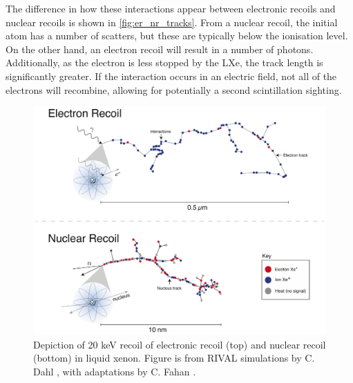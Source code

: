 \par
The difference in how these interactions appear between electronic recoils and nuclear recoils is shown in \autoref{fig:er_nr_tracks}.
From a nuclear recoil, the initial atom has a number of scatters, but these are typically below the ionisation level.
On the other hand, an electron recoil will result in a number of photons.
Additionally, as the electron is less stopped by the LXe, the track length is significantly greater.
If the interaction occurs in an electric field, not all of the electrons will recombine, allowing for potentially a second scintillation sighting.

\begin{figure}
    \centering
    \includegraphics[width=\textwidth]{Figures/LZ/er_nr_tracks.png}
    \caption[Depiction of a 20keV recoil on liquid xenon]{Depiction of 20 keV recoil of electronic recoil (top) and nuclear recoil (bottom) in liquid xenon.
    Figure is from RIVAL simulations by C. Dahl \cite{carldahl_thesis_ref}, with adaptations by C. Fahan \cite{carlosfahan_thesis_ref}.}
    \label{fig:er_nr_tracks}
\end{figure}

